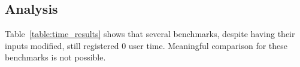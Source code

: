 \documentclass[12pt]{article}
\begin{document}

\subsection*{Analysis}
Table~\ref{table:time_results} shows that several benchmarks, despite having their inputs modified, still registered 0 user time. Meaningful comparison for these benchmarks is not possible.
\end{document}
